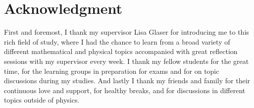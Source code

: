 \section{Acknowledgment}
First and foremost, I thank my supervisor Lisa Glaser for introducing me to
this rich field of study, where I had the chance to learn from a broad variety of
different mathematical and physical topics accompanied with great reflection sessions with
my supervisor every week. I thank my fellow students for the great time,
for the learning groups in preparation for exams and for on topic discussions
during my studies. And lastly I thank my friends and family for their continuous
love and support, for healthy breaks, and for discussions in different topics
outside of physics.
